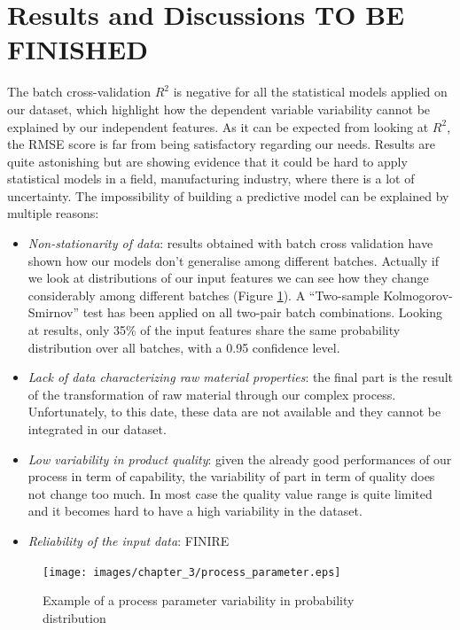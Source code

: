 \section{Results and Discussions TO BE FINISHED} \label{Results and Discussions}

The batch cross-validation $R^2$ is negative for all the statistical models applied on our dataset, which highlight how the dependent variable variability cannot be explained by our independent features. As it can be expected from looking at $R^2$, the RMSE score is far from being satisfactory regarding our needs. 
Results are quite astonishing but are showing evidence that it could be hard to apply statistical models in a field, manufacturing industry, where there is a lot of uncertainty. 
The impossibility of building a predictive model can be explained by multiple reasons:  

\begin{itemize}
    \item \textit{Non-stationarity of data}: results obtained with batch cross validation have shown how our models don’t generalise among different batches. Actually if we look at distributions of our input features we can see how they change considerably among different batches (Figure \ref{fig:Example of a process parameter variability in probability distribution}). A “Two-sample Kolmogorov-Smirnov” test has been applied on all two-pair batch combinations. Looking at results, only 35\% of the input features share the same probability distribution over all batches, with a 0.95 confidence level.
    \item \textit{Lack of data characterizing raw material properties}: the final part is the result of the transformation of raw material through our complex process. Unfortunately, to this date, these data are not available and they cannot be integrated in our dataset.
    \item \textit{Low variability in product quality}: given the already good performances of our process in term of capability, the variability of part in term of quality does not change too much. In most case the quality value range is quite limited and it becomes hard to have a high variability in the dataset.
    \item \textit{Reliability of the input data}: FINIRE
\end{itemize}

\begin{figure}
\centerline{\texttt{[image: images/chapter\_3/process\_parameter.eps]}}
\caption{Example of a process parameter variability in probability distribution}
\label{fig:Example of a process parameter variability in probability distribution}
\end{figure}

